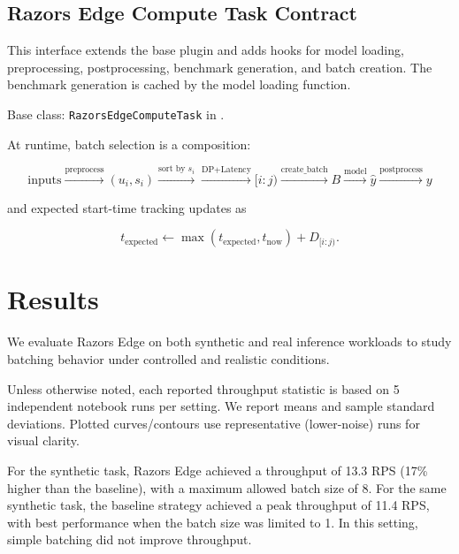 \documentclass{article}
\begin{document}
\hypertarget{63-razors-edge-compute-task-contract}{%
\subsection{Razor\textquotesingle s Edge Compute Task
Contract}\label{63-razors-edge-compute-task-contract}}

This interface extends the base plugin and adds hooks for model loading,
preprocessing, postprocessing, benchmark generation, and batch creation.
The benchmark generation is cached by the model loading function.

Base class: \texttt{RazorsEdgeComputeTask} in
.

At runtime, batch selection is a composition:

\begin{equation}
\text{inputs} \xrightarrow{\text{preprocess}} (u_i,s_i)
\xrightarrow{\text{sort by }s_i} \xrightarrow{\text{DP+Latency}} [i:j)
\xrightarrow{\text{create\_batch}} B
\xrightarrow{\text{model}} \hat{y}
\xrightarrow{\text{postprocess}} y
\end{equation}

and expected start-time tracking updates as

\begin{equation}
t_{\mathrm{expected}} \leftarrow \max(t_{\mathrm{expected}}, t_{\mathrm{now}}) + D_{[i:j)}.
\end{equation}

\hypertarget{7-results}{%
\section{Results}\label{7-results}}

We evaluate Razor\textquotesingle s Edge on both synthetic and real
inference workloads to study batching behavior under controlled and
realistic conditions.

Unless otherwise noted, each reported throughput statistic is based on 5
independent notebook runs per setting. We report means and sample
standard deviations. Plotted curves/contours use representative
(lower-noise) runs for visual clarity.

For the synthetic task, Razor\textquotesingle s Edge achieved a
throughput of 13.3 RPS (17\% higher than the baseline), with a maximum
allowed batch size of 8. For the same synthetic task, the baseline
strategy achieved a peak throughput of 11.4 RPS, with best performance
when the batch size was limited to 1. In this setting, simple batching
did not improve throughput.
\end{document}
